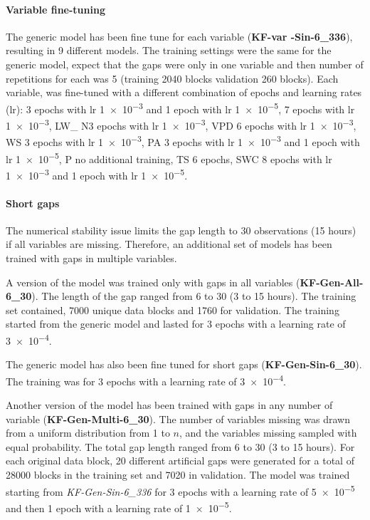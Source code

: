 \documentclass{article}
\begin{document}
\paragraph{Variable fine-tuning} The generic model has been fine tune for each variable (\textbf{KF-\textlangle var \textrangle-Sin-6\_336}), resulting in 9 different models. The training settings were the same for the generic model, expect that the gaps were only in one variable and then number of repetitions for each was 5 (training 2040 blocks validation 260 blocks). Each variable, was fine-tuned with a different combination of epochs and learning rates (lr):  3 epochs with lr \num{1e-3} and 1 epoch with lr \num{1e-5},  \num{7} epochs with lr \num{1e-3}, LW\_ N\num{3} epochs with lr \num{1e-3}, VPD \num{6} epochs with lr \num{1e-3}, WS \num{3} epochs with lr \num{1e-3}, PA \num{3} epochs with lr \num{1e-3} and 1 epoch with lr \num{1e-5}, P no additional training, TS \num{6} epochs, SWC \num{8} epochs with lr \num{1e-3} and 1 epoch with lr \num{1e-5}.

\paragraph{Short gaps} The numerical stability issue limits the gap length to 30 observations (15 hours) if all variables are missing. Therefore, an additional set of models has been trained with gaps in multiple variables.  

A version of the model was trained only with gaps in all variables (\textbf{KF-Gen-All-6\_30}). The length of the gap ranged from 6 to 30 (3 to 15 hours). The training set contained, 7000 unique data blocks and 1760 for validation. The training started from the generic model and lasted for 3 epochs with a learning rate of \num{3e-4}. 

The generic model has also been fine tuned for short gaps (\textbf{KF-Gen-Sin-6\_30}). The training was for 3 epochs with a learning rate of \num{3e-4}.

Another version of the model has been trained with gaps in any number of variable (\textbf{KF-Gen-Multi-6\_30}). The number of variables missing was drawn from a uniform distribution  from 1 to $n$, and the variables missing sampled with equal probability. The total gap length ranged from 6 to 30 (3 to 15 hours). For each original data block, 20 different artificial gaps were generated for a total of 28000 blocks in the training set and 7020 in validation. The model was trained starting from \textit{KF-Gen-Sin-6\_336} for 3 epochs with a learning rate of \num{5e-5} and then 1 epoch with a learning rate of \num{1e-5}.
\end{document}
